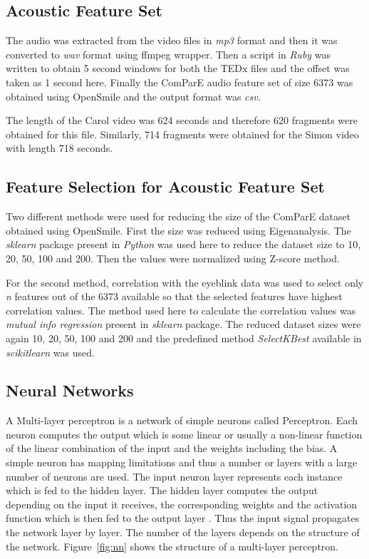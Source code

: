 \subsection{Acoustic Feature Set}
The audio was extracted from the video files in \textit{mp3} format and then it was converted to \textit{wav} format using ffmpeg wrapper. Then a script in \textit{Ruby} was written to obtain 5 second windows for both the TEDx files and the offset was taken as 1 second here. Finally the ComParE audio feature set of size 6373 was obtained using OpenSmile and the output format was \textit{csv}.

The length of the Carol video was 624 seconds and therefore 620 fragments were obtained for this file. Similarly, 714 fragments were obtained for the Simon video with length 718 seconds.

\subsection{Feature Selection for Acoustic Feature Set}
Two different methods were used for reducing the size of the ComParE dataset obtained using OpenSmile. First the size was reduced using Eigenanalysis. The \textit{sklearn} package present in \textit{Python} was used here to reduce the dataset size to 10, 20, 50, 100 and 200. Then the values were normalized using Z-score method.

For the second method, correlation with the eyeblink data was used to select only \textit{n} features out of the 6373 available so that the selected features have highest correlation values. The method used here to calculate the correlation values was \textit{mutual info regression} present in \textit{sklearn} package. The reduced dataset sizes were again 10, 20, 50, 100 and 200 and the predefined method \textit{SelectKBest} available in \textit{scikitlearn} was used.

\subsection{Neural Networks}
A Multi-layer perceptron is a network of simple neurons called Perceptron. Each neuron computes the output which is some linear or usually a non-linear function of the linear combination of the input and the weights including the bias. A simple neuron has mapping limitations and thus a number or layers with a large number of neurons are used. The input neuron layer represents each instance which is fed to the hidden layer. The hidden layer computes the output depending on the input it receives, the corresponding weights and the activation function which is then fed to the output layer \cite{nn}. Thus the input signal propagates the network layer by layer. The number of the layers depends on the structure of the network. Figure~\ref{fig:nn} shows the structure of a multi-layer perceptron.

